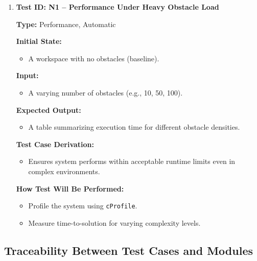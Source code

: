 \documentclass[12pt, titlepage]{article}
\begin{document}
\begin{enumerate}

\item \textbf{Test ID: N1 -- Performance Under Heavy Obstacle Load}  

\textbf{Type:} Performance, Automatic  

\textbf{Initial State:}  
\begin{itemize}
    \item A workspace with no obstacles (baseline).
\end{itemize}

\textbf{Input:}  
\begin{itemize}
    \item A varying number of obstacles (e.g., 10, 50, 100).
\end{itemize}

\textbf{Expected Output:}  
\begin{itemize}
    \item A table summarizing execution time for different obstacle densities.
\end{itemize}

\textbf{Test Case Derivation:}  
\begin{itemize}
    \item Ensures system performs within acceptable runtime limits even in complex environments.
\end{itemize}

\textbf{How Test Will Be Performed:}  
\begin{itemize}
    \item Profile the system using \texttt{cProfile}.
    \item Measure time-to-solution for varying complexity levels.
\end{itemize}

\end{enumerate}



\subsection{Traceability Between Test Cases and Modules}
\end{document}
